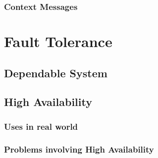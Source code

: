 \subsubsection{Context Messages}


\section{Fault Tolerance}
\subsection{Dependable System}
\subsection{High Availability}
\subsubsection{Uses in real world}
\subsubsection{Problems involving High Availability}

